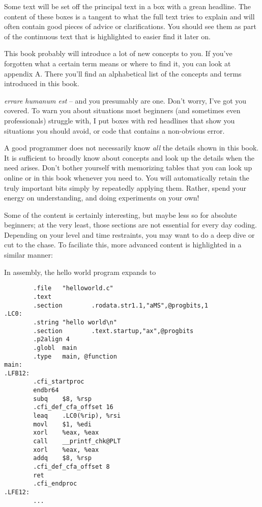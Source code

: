 Some text will be set off the principal text in a box with a grean headline. The content of these boxes is a tangent to what the full text tries to explain and will often contain good pieces of advice or clarifications. You should see them as part of the continuous text that is highlighted to easier find it later on.

\begin{hintbox}
This book probably will introduce a lot of new concepts to you. If you've forgotten what a certain term means or where to find it, you can look at appendix A. There you'll find an alphabetical list of the concepts and terms introduced in this book.
\end{hintbox}

\emph{errare humanum est} -- and you presumably are one. Don't worry, I've got you covered. To warn you about situations most beginners (and sometimes even professionals) struggle with, I put boxes with red headlines that show you situations you should avoid, or code that contains a non-obvious error.

\begin{warnbox}
A good programmer does not necessarily know \emph{all} the details shown in this book. It is sufficient to broadly know about concepts and look up the details when the need arises. Don't bother yourself with memorizing tables that you can look up online or in this book whenever you need to. You will automatically retain the truly important bits simply by repeatedly applying them. Rather, spend your energy on understanding, and doing experiments on your own!
\end{warnbox}

Some of the content is certainly interesting, but maybe less so for absolute beginners; at the very least, those sections are not essential for every day coding. Depending on your level and time restraints, you may want to do a deep dive or cut to the chase. To faciliate this, more advanced content is highlighted in a similar manner:
\begin{plusbox}
In assembly, the hello world program expands to
\begin{codebox}[helloworld.s]
\begin{verbatim}
        .file   "helloworld.c"
        .text
        .section        .rodata.str1.1,"aMS",@progbits,1
.LC0:
        .string "hello world\n"
        .section        .text.startup,"ax",@progbits
        .p2align 4
        .globl  main
        .type   main, @function
main:
.LFB12:
        .cfi_startproc
        endbr64
        subq    $8, %rsp
        .cfi_def_cfa_offset 16
        leaq    .LC0(%rip), %rsi
        movl    $1, %edi
        xorl    %eax, %eax
        call    __printf_chk@PLT
        xorl    %eax, %eax
        addq    $8, %rsp
        .cfi_def_cfa_offset 8
        ret
        .cfi_endproc
.LFE12:
        ...
\end{verbatim}
\end{codebox}
\end{plusbox}

